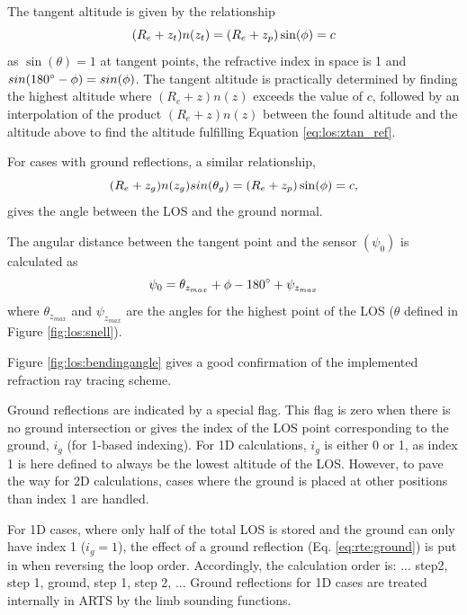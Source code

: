   The tangent altitude is given by the relationship
  \begin{equation}
    (R_e+z_t)n(z_t) = (R_e+z_p)\sin(\phi) = c
   \label{eq:los:ztan_ref}
  \end{equation}
  as $\sin(\theta)=1$ at tangent points, the refractive index in space
  is 1 and $sin(180^{\circ}-\phi)=sin(\phi)$. The tangent altitude
  is practically determined by finding the highest altitude where
  $(R_e+z)n(z)$ exceeds the value of $c$, followed by an interpolation
  of the product $(R_e+z)n(z)$ between the found altitude and the
  altitude above to find the altitude fulfilling Equation
  \ref{eq:los:ztan_ref}.
 
  For cases with ground reflections, a similar relationship,
  \begin{equation}
    (R_e+z_g)n(z_g)sin(\theta_g) = (R_e+z_p)\sin(\phi) = c,
  \end{equation}
  gives the angle between the LOS and the ground normal.

  The angular distance between the tangent point and the sensor $(\psi_0)$
  is calculated as
  \begin{equation}
    \psi_0 = \theta_{z_{max}} + \phi  - 180^\circ + \psi_{z_{max}}
  \end{equation}
  where $\theta_{z_{max}}$ and $\psi_{z_{max}}$ are the angles for the
  highest point of the LOS ($\theta$ defined in Figure \ref{fig:los:snell}).
  
  Figure \ref{fig:los:bendingangle} gives a good confirmation of the
  implemented refraction ray tracing scheme.

  
  
  \label{sec:los:ground}
  
  Ground reflections are indicated by a special flag. This flag is
  zero when there is no ground intersection or gives the index of the
  LOS point corresponding to the ground, $i_g$ (for 1-based indexing).
  For 1D calculations, $i_g$ is either 0 or 1, as index 1 is here
  defined to always be the lowest altitude of the LOS. However, to
  pave the way for 2D calculations, cases where the ground is placed
  at other positions than index 1 are handled.
  
  For 1D cases, where only half of the total LOS is stored and the
  ground can only have index 1 ($i_g=1$), the effect of a ground
  reflection (Eq. \ref{eq:rte:ground}) is put in when reversing the
  loop order. Accordingly, the calculation order is: ... step2, step
  1, ground, step 1, step 2, ... Ground reflections for 1D cases are
  treated internally in ARTS by the limb sounding functions.
  

